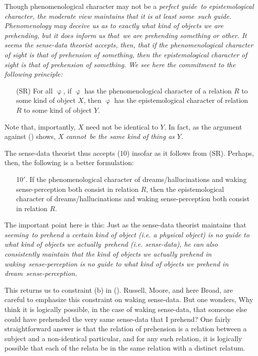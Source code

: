Though phenomenological character may not be a \em perfect guide\em\ to epistemological character, the moderate view maintains that it is at least \em some\em\ such guide. Phenomenology may deceive us as to exactly what kind of objects we are prehending, but it does inform us \em that\em\ we are prehending something or other. It seems the sense-data theorist accepts, then, that if the phenomenological character of sight is that of prehension of \em something\em, then the epistemological character of sight is that of prehension of \em something\em. We see here the commitment to the following principle:
\begin{enumerate}

\item[(SR)] For all $\upvarphi$, if $\upvarphi$ has the phenomenological character of a relation $R$ to some kind of object $X$, then $\upvarphi$ has the epistemological character of relation $R$ to some kind of object $Y$.

\end{enumerate}
Note that, importantly, $X$ need not be identical to $Y$. In fact, as the argument against (\PRO) shows, $X$ \em cannot\em\ be the same kind of thing as $Y$.

The sense-data theorist thus accepts (10) insofar as it follows from (SR). Perhaps, then, the following is a better formulation:
\begin{enumerate}

\item[10$'$.] If the phenomenological character of dreams/hallucinations and waking sense-perception both consist in relation $R$, then the epistemological character of dreams/hallucinations and waking sense-perception both consist in relation $R$.

\end{enumerate}
The important point here is this: Just as the sense-data theorist maintains that \em seeming\em\ to prehend a certain kind of object (i.e. a physical object) is no guide to what kind of objects we \em actually\em\ prehend (i.e. sense-data), he can also consistently maintain that the kind of objects we actually prehend in \em waking\em\ sense-perception is no guide to what kind of objects we prehend in \em dream\em\ sense-perception. 

This returns us to constraint (b) in (\PRS). Russell, Moore, and here Broad, are careful to emphasize this constraint on waking sense-data. But one wonders, Why think it is logically possible, in the case of waking sense-data, that someone else could have prehended the very same sense-data that I prehend? One fairly straightforward answer is that the relation of prehension is a relation between a subject and a non-identical particular, and for any such relation, it is logically possible that each of the relata be in the same relation with a distinct relatum. 

